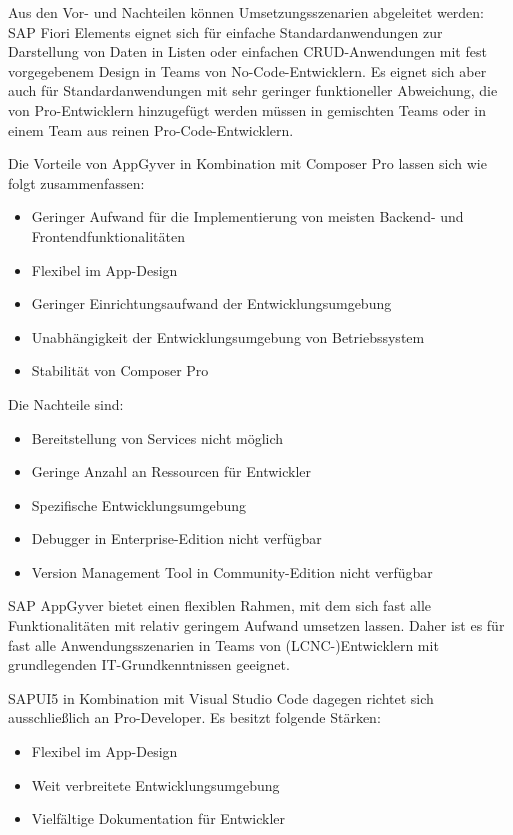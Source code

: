 Aus den Vor- und Nachteilen können Umsetzungsszenarien abgeleitet werden: SAP Fiori Elements eignet sich für einfache Standardanwendungen zur Darstellung von Daten in Listen oder einfachen CRUD-Anwendungen mit fest vorgegebenem Design in Teams von No-Code-Entwicklern. Es eignet sich aber auch für Standardanwendungen mit sehr geringer funktioneller Abweichung, die von Pro-Entwicklern hinzugefügt werden müssen in gemischten Teams oder in einem Team aus reinen Pro-Code-Entwicklern.

Die Vorteile von AppGyver in Kombination mit Composer Pro lassen sich wie folgt zusammenfassen: 
\begin{itemize}[noitemsep]
\item Geringer Aufwand für die Implementierung von meisten Backend- und Frontendfunktionalitäten
\item Flexibel im App-Design
\item Geringer Einrichtungsaufwand der Entwicklungsumgebung
\item Unabhängigkeit der Entwicklungsumgebung von Betriebssystem
\item Stabilität von Composer Pro
\end{itemize}

Die Nachteile sind:
\begin{itemize}[noitemsep]
\item Bereitstellung von Services nicht möglich
\item Geringe Anzahl an Ressourcen für Entwickler
\item Spezifische Entwicklungsumgebung
\item Debugger in Enterprise-Edition nicht verfügbar
\item Version Management Tool in Community-Edition nicht verfügbar
\end{itemize}

SAP AppGyver bietet einen flexiblen Rahmen, mit dem sich fast alle Funktionalitäten mit relativ geringem Aufwand umsetzen lassen. Daher ist es für fast alle Anwendungsszenarien in Teams von (LCNC-)Entwicklern mit grundlegenden IT-Grundkenntnissen geeignet.

SAPUI5 in Kombination mit Visual Studio Code dagegen richtet sich ausschließlich an Pro-Developer. Es besitzt folgende Stärken:

\begin{itemize}[noitemsep]
\item Flexibel im App-Design
\item Weit verbreitete Entwicklungsumgebung
\item Vielfältige Dokumentation für Entwickler
\end{itemize}

